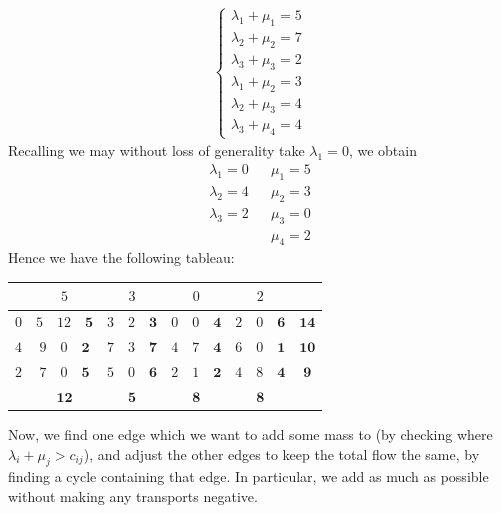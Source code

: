 \documentclass{../../template/note}
\begin{document}
\begin{example*}
\begin{align*}
\begin{cases}
                \lambda_1 + \mu_1 = 5 \\
                \lambda_2 + \mu_2 = 7 \\
                \lambda_3 + \mu_3 = 2 \\
                \lambda_1 + \mu_2 = 3 \\
                \lambda_2 + \mu_3 = 4 \\
                \lambda_3 + \mu_4 = 4           
            \end{cases}
        \end{align*}
        Recalling we may without loss of generality take $\lambda_1 = 0$, we obtain
        \begin{align*}
            \lambda_1 = 0 && \mu_1 = 5 \\
            \lambda_2 = 4 && \mu_2 = 3 \\
            \lambda_3 = 2 && \mu_3 = 0 \\
            && \mu_4 = 2
        \end{align*}
        Hence we have the following tableau:
        \begin{center}    
            \begin{tabular}{| c | c | c | c | c | c |}
                \hline
                & $5$ & $3$ & $0$ & $2$ &  \\
                \hline
                $0$ & $5 \quad 12 \quad \mathbf{5}$ & $3 \quad 2 \quad \mathbf{3}$ & $0 \quad 0 \quad \mathbf{4}$ & $2 \quad 0 \quad \mathbf{6}$ & $\mathbf{14}$ \\
                $4$ & $9 \quad 0 \quad \mathbf{2}$ & $7 \quad 3 \quad \mathbf{7}$ & $4 \quad 7 \quad \mathbf{4}$ & $6 \quad 0 \quad \mathbf{1}$ & $\mathbf{10}$ \\
                $2$ & $7 \quad 0 \quad \mathbf{5}$ & $5 \quad 0 \quad \mathbf{6}$ & $2 \quad 1 \quad \mathbf{2}$ & $4 \quad 8 \quad \mathbf{4}$ & $\mathbf{9}$ \\
                \hline
                & $\mathbf{12}$ & $\mathbf{5}$ & $\mathbf{8}$ & $\mathbf{8}$ & \\
                \hline
            \end{tabular}        
        \end{center}    
        Now, we find one edge which we want to add some mass to (by checking where $\lambda_i + \mu_j > c_{ij}$), and adjust the other edges to keep the total flow the same, by finding a cycle containing that edge. In particular, we add as much as possible without making any transports negative.
    \end{example*}
    
\end{document}
